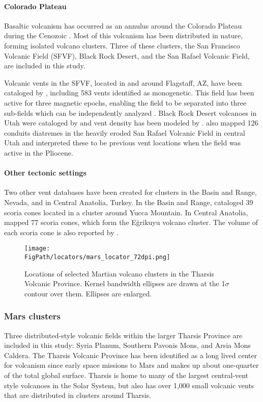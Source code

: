 \paragraph{Colorado Plateau} Basaltic volcanism has occurred as an annulus around the Colorado Plateau during the Cenozoic \citep{tanaka1986migration}. Most of this volcanism has been distributed in nature, forming isolated volcano clusters. Three of these clusters, the San Francisco Volcanic Field (SFVF), Black Rock Desert, and the San Rafael Volcanic Field, are included in this study. 

Volcanic vents in the SFVF, located in and around Flagstaff, AZ, have been cataloged by \citet{harburger2014probabilistic}, including 583 vents identified as monogenetic. This field has been active for three magnetic epochs, enabling the field to be separated into three sub-fields which can be independently analyzed \citep{tanaka1986migration}. Black Rock Desert volcanoes in Utah were cataloged by \citet{hintz2008physical} and vent density has been modeled by \citet{kiyosugi2012relationship}. \citet{kiyosugi2012relationship} also mapped 126 conduits diatremes in the heavily eroded San Rafael Volcanic Field in central Utah and interpreted these to be previous vent locations when the field was active in the Pliocene.

\paragraph{Other tectonic settings} Two other vent databases have been created for clusters in the Basin and Range, Nevada, and in Central Anatolia, Turkey. In the Basin and Range, \citet{connor1995three} cataloged 39 scoria cones located in a cluster around Yucca Mountain. In Central Anatolia, \citet{uslular2015size} mapped 77 scoria cones, which form the E\u{g}rikuyu volcano cluster. The volume of each scoria cone is also reported by \citet{uslular2015size}.

\begin{figure}
\centering
\texttt{[image: \\FigPath/locators/mars\_locator\_72dpi.png]}
\caption[Locations of selected Martian volcano clusters in the Tharsis Volcanic Province]{Locations of selected Martian volcano clusters in the Tharsis Volcanic Province. Kernel bandwidth ellipses are drawn at the 1$\sigma$ contour over them. Ellipses are enlarged.}
\label{fig_marslocator}
\end{figure}

\subsubsection{Mars clusters}
Three distributed-style volcanic fields within the larger Tharsis Province are included in this study: Syria Planum, Southern Pavonis Mons, and Arsia Mons Caldera. The Tharsis Volcanic Province has  been identified as a long lived center for volcanism since early space missions to Mars \citep{carr1977some} and makes up about one-quarter of the total global surface. Tharsis is home to many of the largest central-vent style volcanoes in the Solar System, but also has over 1,000 small volcanic vents that are distributed in clusters around Tharsis.

